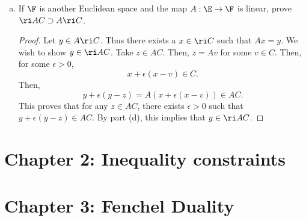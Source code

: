\documentclass[12pt, letterpaper]{article}
\numberwithin{equation}{subsection}
\begin{document}
\begin{enumerate}[(a)]
\begin{proof}
In other words, $z-x$ is equal to a positive constant times a convex 
combination of elements of $C-x$. But $C-x$ is convex. Therefore, 
it is equal to a positive constant times an element of $C-x$, i.e. 
$z-x\in\R_+(C-x)$. Now let $e^1,\ldots, e^n$ be an orthonormal 
basis for $\aff C-x = \spn{(C-x)}$. By the previous, there exist 
$c_1,\ldots, c_n > 0$ such that $c_ie^i, -c_ie^i\in C-x$ 
for every $i\in[n]$.
This implies that $0\in\ri(C-x)$, i.e. $x\in\ri(C)$.
\end{proof}
\item If $\F$ is another Euclidean space and the map $A:\E\to\F$ is 
linear, prove $\ri AC\supset A\ri C$.
\begin{proof}
Let $y\in A\ri C$. Thus there exists a $x\in\ri C$ such that 
$Ax = y$. We wish to show $y\in \ri AC$. Take $z\in AC$. Then, 
$z=Av$ for some $v\in C$. Then, for some $\epsilon >0$, 
\begin{equation*}
x + \epsilon(x-v)\in C.
\end{equation*}
Then, 
\begin{equation*}
y + \epsilon(y-z) = A(x+\epsilon(x-v)) \in AC.
\end{equation*}
This proves that for any $z\in AC$, there exists $\epsilon > 0$ 
such that $y+\epsilon(y-z) \in AC$. By part (d), this implies that 
$y\in \ri AC$.
\end{proof}
\end{enumerate}

\newpage
\section{Chapter 2: Inequality 
constraints}



\section{Chapter 3: Fenchel Duality}

\newpage

\end{document}
